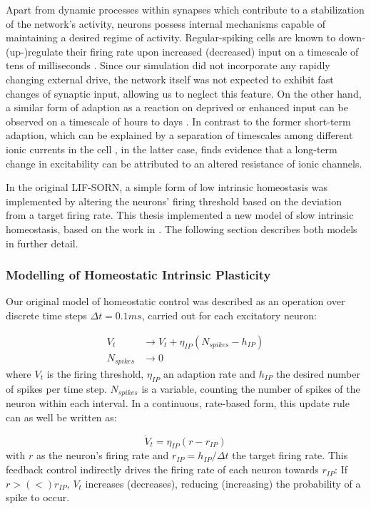 \documentclass[10pt,a4paper]{article}
\begin{document}
Apart from dynamic processes within synapses which contribute to a stabilization of the network's activity, neurons possess internal mechanisms capable of maintaining a desired regime of activity. Regular-spiking cells are known to down-(up-)regulate their firing rate upon increased (decreased) input on a timescale of tens of milliseconds \cite{Connors_Gutnick_Spike_Patterns,Benda_Herz_Spike_Frequ_Adaption}. Since our simulation did not incorporate any rapidly changing external drive, the network itself was not expected to exhibit fast changes of synaptic input, allowing us to neglect this feature. On the other hand, a similar form of adaption as a reaction on deprived or enhanced input can be observed on a timescale of hours to days \cite{Desai_IP}. In contrast to the former short-term adaption, which can be explained by a separation of timescales among different ionic currents in the cell \cite[p.~252-256]{Izhikevich_Dynsys}, in the latter case, \cite{Desai_IP} finds evidence that a long-term change in excitability can be attributed to an altered resistance of ionic channels.

In the original LIF-SORN, a simple form of low intrinsic homeostasis was implemented by altering the neurons' firing threshold based on the deviation from a target firing rate. This thesis implemented a new model of slow intrinsic homeostasis, based on the work in \cite{Sweeney_Paper}. The following section describes both models in further detail.


\subsubsection{Modelling of Homeostatic Intrinsic Plasticity}

Our original model of homeostatic control was described as an operation over discrete time steps $\Delta t = 0.1ms$, carried out for each excitatory neuron:

\begin{align}
V_t &\rightarrow V_t + \eta_{IP} (N_{spikes} - h_{IP}) \label{can_hom_1}\\
N_{spikes} &\rightarrow 0 \label{can_hom_2}
\end{align}
where $V_t$ is the firing threshold, $\eta_{IP}$ an adaption rate and $h_{IP}$ the desired number of spikes per time step. $N_{spikes}$ is a variable, counting the number of spikes of the neuron within each interval. In a continuous, rate-based form, this update rule can as well be written as:

\begin{equation}
\dot{V}_t = \eta_{IP}(r-r_{IP}) \label{can_hom_rate}
\end{equation}
with $r$ as the neuron's firing rate and $r_{IP}=h_{IP}/\Delta t$ the target firing rate. This feedback control indirectly drives the firing rate of each neuron towards $r_{IP}$: If $r>(<)r_{IP}$, $V_t$ increases (decreases), reducing (increasing) the probability of a spike to occur. 
\end{document}
